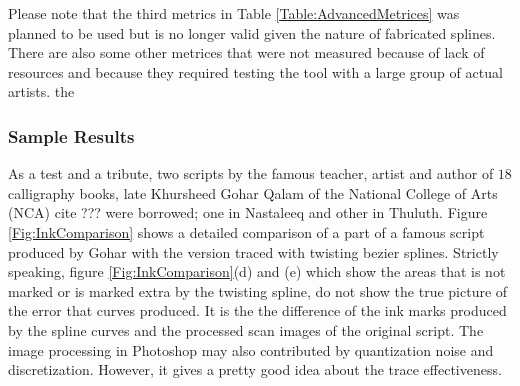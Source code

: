 \begin{table}[ht]
\centering
{}
\caption{Advanced metrices to gauge the effectiveness of twisting bezier splines.}
\label{Table:AdvancedMetrices}
\end{table} 

Please note that the third metrics in Table \ref{Table:AdvancedMetrices} was planned to be used but is no longer valid given the nature of fabricated splines.
There are also some other metrices that were not measured because of lack of resources and because they required testing the tool with a large group of actual artists.
the 
\subsubsection{Sample Results}
As a test and a tribute, two scripts by the famous teacher, artist and author of $18$ calligraphy books, late Khursheed Gohar Qalam of the National College of Arts (NCA) cite ??? were borrowed; one in Nastaleeq and other in Thuluth. Figure \ref{Fig:InkComparison} shows a detailed comparison of a part of a famous script produced by Gohar with the version traced with twisting bezier splines. Strictly speaking, figure \ref{Fig:InkComparison}(d) and (e) which show the areas that is not marked or is marked extra by the twisting spline, do not show the true picture of the error that curves produced. It is the the difference of the ink marks produced by the spline curves and the processed scan images of the original script. The image processing in Photoshop may also contributed by quantization noise and discretization. However, it gives a pretty good idea about the trace effectiveness.

